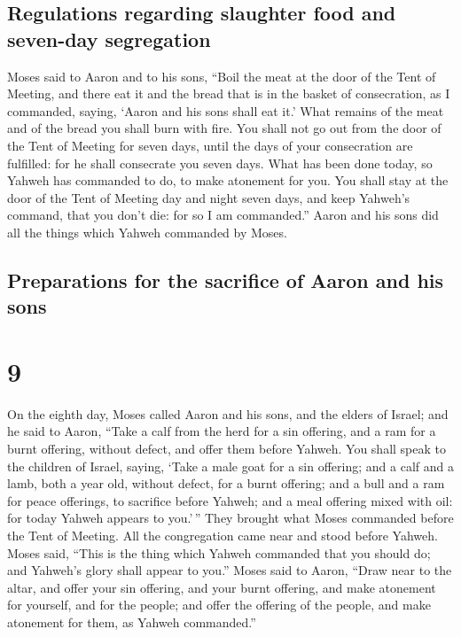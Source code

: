 \hypertarget{regulations-regarding-slaughter-food-and-seven-day-segregation}{%
\subsection{Regulations regarding slaughter food and seven-day
segregation}\label{regulations-regarding-slaughter-food-and-seven-day-segregation}}

 Moses said to Aaron and to his sons, ``Boil the meat at
the door of the Tent of Meeting, and there eat it and the bread that is
in the basket of consecration, as I commanded, saying, `Aaron and his
sons shall eat it.'  What remains of the meat and of the
bread you shall burn with fire.  You shall not go out
from the door of the Tent of Meeting for seven days, until the days of
your consecration are fulfilled: for he shall consecrate you seven days.
 What has been done today, so Yahweh has commanded to do,
to make atonement for you.  You shall stay at the door of
the Tent of Meeting day and night seven days, and keep Yahweh's command,
that you don't die: for so I am commanded.''  Aaron and
his sons did all the things which Yahweh commanded by Moses.

\hypertarget{preparations-for-the-sacrifice-of-aaron-and-his-sons}{%
\subsection{Preparations for the sacrifice of Aaron and his
sons}\label{preparations-for-the-sacrifice-of-aaron-and-his-sons}}

\hypertarget{section-8}{%
\section{9}\label{section-8}}

 On the eighth day, Moses called Aaron and his sons, and
the elders of Israel;  and he said to Aaron, ``Take a calf
from the herd for a sin offering, and a ram for a burnt offering,
without defect, and offer them before Yahweh.  You shall
speak to the children of Israel, saying, `Take a male goat for a sin
offering; and a calf and a lamb, both a year old, without defect, for a
burnt offering;  and a bull and a ram for peace offerings,
to sacrifice before Yahweh; and a meal offering mixed with oil: for
today Yahweh appears to you.'\,''  They brought what Moses
commanded before the Tent of Meeting. All the congregation came near and
stood before Yahweh.  Moses said, ``This is the thing
which Yahweh commanded that you should do; and Yahweh's glory shall
appear to you.''  Moses said to Aaron, ``Draw near to the
altar, and offer your sin offering, and your burnt offering, and make
atonement for yourself, and for the people; and offer the offering of
the people, and make atonement for them, as Yahweh commanded.''

